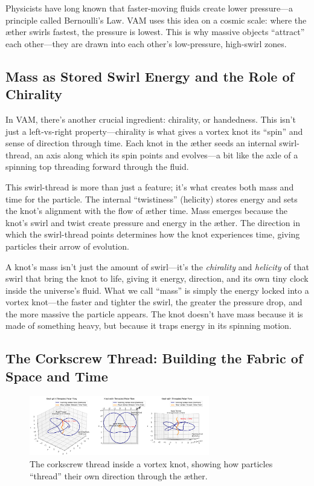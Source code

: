Physicists have long known that faster-moving fluids create lower pressure—a principle called Bernoulli’s Law. VAM uses this idea on a cosmic scale: where the æther swirls fastest, the pressure is lowest. This is why massive objects “attract” each other—they are drawn into each other’s low-pressure, high-swirl zones.


\subsection*{Mass as Stored Swirl Energy and the Role of Chirality}

In VAM, there’s another crucial ingredient: chirality, or handedness. This isn’t just a left-vs-right property—chirality is what gives a vortex knot its “spin” and sense of direction through time. Each knot in the æther seeds an internal swirl-thread, an axis along which its spin points and evolves—a bit like the axle of a spinning top threading forward through the fluid.


This swirl-thread is more than just a feature; it’s what creates both mass and time for the particle. The internal “twistiness” (helicity) stores energy and sets the knot’s alignment with the flow of æther time. Mass emerges because the knot’s swirl and twist create pressure and energy in the æther. The direction in which the swirl-thread points determines how the knot experiences time, giving particles their arrow of evolution.


A knot’s mass isn’t just the amount of swirl—it’s the \textit{chirality} and \textit{helicity} of that swirl that bring the knot to life, giving it energy, direction, and its own tiny clock inside the universe’s fluid. What we call “mass” is simply the energy locked into a vortex knot—the faster and tighter the swirl, the greater the pressure drop, and the more massive the particle appears. The knot doesn’t have mass because it is made of something heavy, but because it traps energy in its spinning motion.


\subsection*{The Corkscrew Thread: Building the Fabric of Space and Time}
\begin{figure}[H]
    \centering
    \includegraphics[width=0.7\textwidth]{images/KnotThreadedPolarFlow}
    \caption{The corkscrew thread inside a vortex knot, showing how particles “thread” their own direction through the æther.}
\end{figure}

